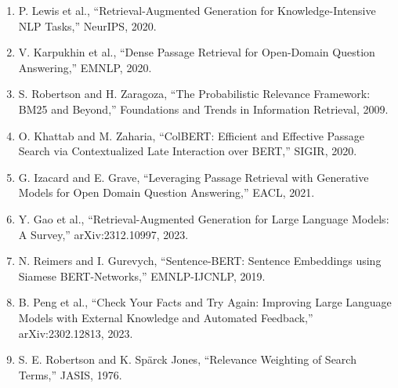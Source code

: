 \documentclass[11pt,a4paper]{article}
\begin{document}
\begin{enumerate}[leftmargin=1.2cm]
    \item P. Lewis et al., ``Retrieval-Augmented Generation for Knowledge-Intensive NLP Tasks,'' NeurIPS, 2020.
    \item V. Karpukhin et al., ``Dense Passage Retrieval for Open-Domain Question Answering,'' EMNLP, 2020.
    \item S. Robertson and H. Zaragoza, ``The Probabilistic Relevance Framework: BM25 and Beyond,'' Foundations and Trends in Information Retrieval, 2009.
    \item O. Khattab and M. Zaharia, ``ColBERT: Efficient and Effective Passage Search via Contextualized Late Interaction over BERT,'' SIGIR, 2020.
    \item G. Izacard and E. Grave, ``Leveraging Passage Retrieval with Generative Models for Open Domain Question Answering,'' EACL, 2021.
    \item Y. Gao et al., ``Retrieval-Augmented Generation for Large Language Models: A Survey,'' arXiv:2312.10997, 2023.
    \item N. Reimers and I. Gurevych, ``Sentence-BERT: Sentence Embeddings using Siamese BERT-Networks,'' EMNLP-IJCNLP, 2019.
    \item B. Peng et al., ``Check Your Facts and Try Again: Improving Large Language Models with External Knowledge and Automated Feedback,'' arXiv:2302.12813, 2023.
    \item S. E. Robertson and K. Spärck Jones, ``Relevance Weighting of Search Terms,'' JASIS, 1976.
\end{enumerate}
\end{document}
